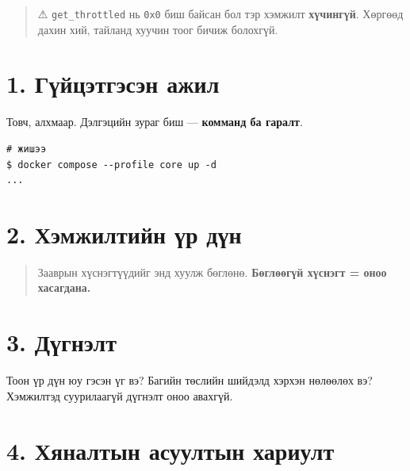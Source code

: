 \begin{quote}
⚠ \texttt{get\_throttled} нь \texttt{0x0} биш байсан бол тэр хэмжилт \textbf{хүчингүй}. Хөргөөд дахин хий, тайланд хуучин тоог бичиж болохгүй.
\end{quote}

\hypertarget{ux433ux4afux439ux446ux44dux442ux433ux44dux441ux44dux43d-ux430ux436ux438ux43b}{%
\section{1. Гүйцэтгэсэн ажил}\label{ux433ux4afux439ux446ux44dux442ux433ux44dux441ux44dux43d-ux430ux436ux438ux43b}}

Товч, алхмаар. Дэлгэцийн зураг биш --- \textbf{комманд ба гаралт}.

\begin{verbatim}
# жишээ
$ docker compose --profile core up -d
...
\end{verbatim}

\hypertarget{ux445ux44dux43cux436ux438ux43bux442ux438ux439ux43d-ux4afux440-ux434ux4afux43d}{%
\section{2. Хэмжилтийн үр дүн}\label{ux445ux44dux43cux436ux438ux43bux442ux438ux439ux43d-ux4afux440-ux434ux4afux43d}}

\begin{quote}
Зааврын хүснэгтүүдийг энд хуулж бөглөнө. \textbf{Бөглөөгүй хүснэгт = оноо хасагдана.}
\end{quote}

\hypertarget{ux434ux4afux433ux43dux44dux43bux442}{%
\section{3. Дүгнэлт}\label{ux434ux4afux433ux43dux44dux43bux442}}

Тоон үр дүн юу гэсэн үг вэ? Багийн төслийн шийдэлд хэрхэн нөлөөлөх вэ?
Хэмжилтэд суурилаагүй дүгнэлт оноо авахгүй.

\hypertarget{ux445ux44fux43dux430ux43bux442ux44bux43d-ux430ux441ux443ux443ux43bux442ux44bux43d-ux445ux430ux440ux438ux443ux43bux442}{%
\section{4. Хяналтын асуултын хариулт}\label{ux445ux44fux43dux430ux43bux442ux44bux43d-ux430ux441ux443ux443ux43bux442ux44bux43d-ux445ux430ux440ux438ux443ux43bux442}}

